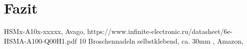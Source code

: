 \documentclass[a4paper,
DIV=13,
12pt,
BCOR=10mm,
department=FakEI,
parskip=half,
automark,
]{article}
\begin{document}
\section{Fazit}








\cleardoublepage
\begin{appendix}
\listoffigures

\cleardoublepage
\begin{thebibliography}{99}
 HSMx-A10x-xxxxx, Avago, https://www.infinite-electronic.ru/datasheet/6e-HSMA-A100-Q00H1.pdf
 10 Broschennadeln selbstklebend, ca. 30mm , Amazon, 
\end{thebibliography}

\cleardoublepage

\end{appendix}
\end{document}

